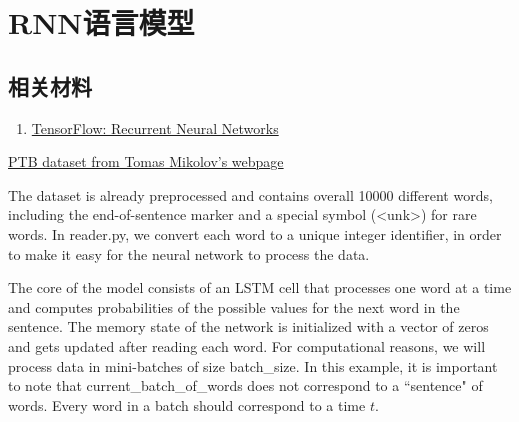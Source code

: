 \section{RNN语言模型}

\subsection{相关材料}
\begin{enumerate}
\item \href{https://www.tensorflow.org/tutorials/recurrent}{TensorFlow: Recurrent Neural Networks}
\end{enumerate}

\href{http://www.fit.vutbr.cz/~imikolov/rnnlm/simple-examples.tgz}{PTB dataset from Tomas Mikolov's webpage}

The dataset is already preprocessed and contains overall 10000 different words,
including the end-of-sentence marker and a special symbol (<unk>) for rare words.
In reader.py, we convert each word to a unique integer identifier,
in order to make it easy for the neural network to process the data.

The core of the model consists of an LSTM cell that processes one word at a time and
computes probabilities of the possible values for the next word in the sentence.
The memory state of the network is initialized with a vector of zeros
and gets updated after reading each word.
For computational reasons, we will process data in mini-batches of size batch\_size.
In this example, it is important to note that current\_batch\_of\_words does not correspond to a ``sentence" of words.
Every word in a batch should correspond to a time $t$.

\ifx\projectsnotes\undefined
    
\fi
